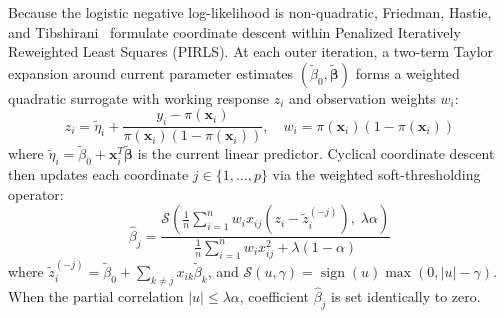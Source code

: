 \documentclass[11pt,oneside]{book}
\begin{document}
Because the logistic negative log-likelihood is non-quadratic, Friedman, Hastie, and Tibshirani~\cite{friedman2010regularization} formulate coordinate descent within Penalized Iteratively Reweighted Least Squares (PIRLS). At each outer iteration, a two-term Taylor expansion around current parameter estimates $(\tilde{\beta}_0, \tilde{\boldsymbol{\beta}})$ forms a weighted quadratic surrogate with working response $z_i$ and observation weights $w_i$:
\begin{equation}
z_i = \tilde{\eta}_i + \frac{y_i - \pi(\mathbf{x}_i)}{\pi(\mathbf{x}_i)(1 - \pi(\mathbf{x}_i))}, \quad w_i = \pi(\mathbf{x}_i)(1 - \pi(\mathbf{x}_i))
\end{equation}
where $\tilde{\eta}_i = \tilde{\beta}_0 + \mathbf{x}_i^T \tilde{\boldsymbol{\beta}}$ is the current linear predictor. Cyclical coordinate descent then updates each coordinate $j \in \{1, \dots, p\}$ via the weighted soft-thresholding operator:
\begin{equation}
\hat{\beta}_j = \frac{\mathcal{S}\left( \frac{1}{n}\sum_{i=1}^n w_i x_{ij}(z_i - \tilde{z}_i^{(-j)}), \; \lambda \alpha \right)}{\frac{1}{n}\sum_{i=1}^n w_i x_{ij}^2 + \lambda(1 - \alpha)}
\end{equation}
where $\tilde{z}_i^{(-j)} = \tilde{\beta}_0 + \sum_{k \ne j} x_{ik}\tilde{\beta}_k$, and $\mathcal{S}(u, \gamma) = \operatorname{sign}(u) \max(0, |u| - \gamma)$. When the partial correlation $|u| \le \lambda \alpha$, coefficient $\hat{\beta}_j$ is set identically to zero.
\end{document}
